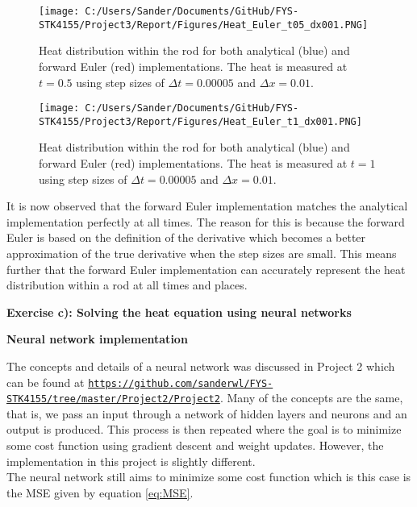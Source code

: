 \documentclass[12pt,a4paper]{article}
\begin{document}
\begin{figure}[H]
\centering
\texttt{[image: C:/Users/Sander/Documents/GitHub/FYS-STK4155/Project3/Report/Figures/Heat\_Euler\_t05\_dx001.PNG]}
\caption{\label{fig:rodHeatEulerT05DX001} Heat distribution within the rod for both analytical (blue) and forward Euler (red) implementations. The heat is measured at $t = 0.5$ using step sizes of $\Delta t = 0.00005$ and $\Delta x = 0.01$.}
\end{figure}

\begin{figure}[H]
\centering
\texttt{[image: C:/Users/Sander/Documents/GitHub/FYS-STK4155/Project3/Report/Figures/Heat\_Euler\_t1\_dx001.PNG]}
\caption{\label{fig:rodHeatEulerT1DX001} Heat distribution within the rod for both analytical (blue) and forward Euler (red) implementations. The heat is measured at $t = 1$ using step sizes of $\Delta t = 0.00005$ and $\Delta x = 0.01$.}
\end{figure}

\noindent It is now observed that the forward Euler implementation matches the analytical implementation perfectly at all times. The reason for this is because the forward Euler is based on the definition of the derivative which becomes a better approximation of the true derivative when the step sizes are small. This means further that the forward Euler implementation can accurately represent the heat distribution within a rod at all times and places.

\newpage

\begin{center}
\Large{\textbf{Exercise c): Solving the heat equation using neural networks}}
\end{center}

\begin{center}
\large{\textbf{Neural network implementation}}
\end{center}

\noindent The concepts and details of a neural network was discussed in Project 2 which can be found at \href{{https://github.com/sanderwl/FYS-STK4155/tree/master/Project2/Project2}}{\nolinkurl{https://github.com/sanderwl/FYS-STK4155/tree/master/Project2/Project2}}. Many of the concepts are the same, that is, we pass an input through a network of hidden layers and neurons and an output is produced. This process is then repeated where the goal is to minimize some cost function using gradient descent and weight updates. However, the implementation in this project is slightly different. 
\\
The neural network still aims to minimize some cost function which is this case is the MSE given by equation \ref{eq:MSE}.
\end{document}
